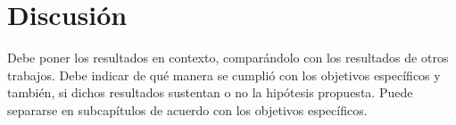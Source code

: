 \chapter{Discusión}
Debe poner los resultados en contexto, comparándolo con los resultados de otros trabajos. Debe indicar de qué manera se cumplió con los objetivos específicos y también, si dichos resultados sustentan o no la hipótesis propuesta. Puede separarse en subcapítulos de acuerdo con los objetivos específicos.
